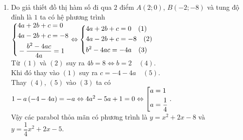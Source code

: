 \begin{bt}
{\begin{enumerate}
\begin{center}
		\end{center}
	  		\item Do giả thiết đồ thị hàm số  đi qua $2$ điểm $A\left(2; 0\right)$, $B\left(- 2; - 8\right)$ và tung độ đỉnh là $1$ ta có hệ phương trình\\
	  		$\left\{\begin{aligned}& 4a + 2b + c = 0\\ &4a - 2b + c = - 8\\&- \dfrac{b^2 - 4ac}{4a} = 1\end{aligned}\right.\Leftrightarrow \left\{\begin{aligned}& 4a + 2b + c = 0\quad (1)\\ &4a - 2b + c = - 8\quad (2)\\&b^2 - 4ac = - 4a\quad(3)\end{aligned}\right.$\\
	  	Từ $(1)$ và $(2)$ suy ra $4b  = 8\Leftrightarrow b = 2\quad (4)$.\\
	  	Khi đó thay vào $(1)$ suy ra $c = - 4 - 4a\quad (5)$.\\
	  Thay $(4)$, $(5)$ vào $(3)$ ta có\\
	  $1 - a\left(- 4 - 4a\right) = - a \Leftrightarrow 4a^2 - 5a + 1 = 0 \Leftrightarrow \left[\begin{aligned}& a = 1 \\ & a = \dfrac{1}{4}\end{aligned}\right..$\\
  		Vậy các parabol thỏa mãn có phương trình là $y = x^2 + 2x - 8$ và $y = \dfrac{1}{4}x^2 + 2x - 5$. 
  				\end{enumerate}
		}
\end{bt}
